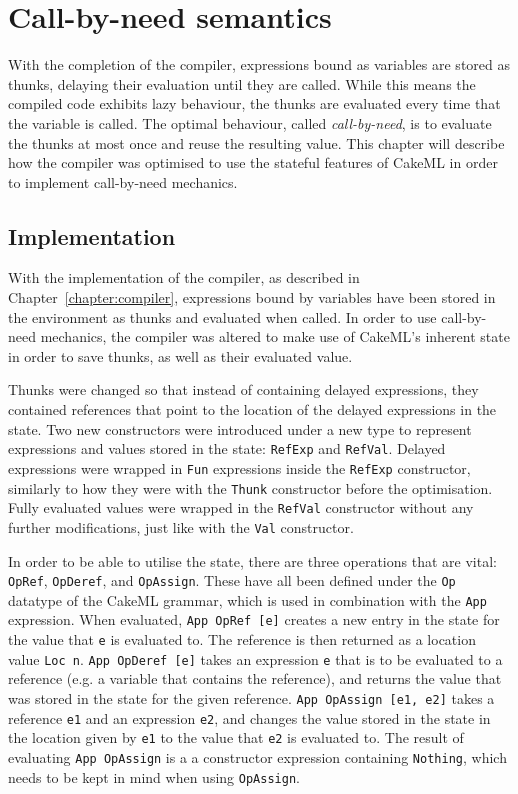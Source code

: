\chapter{Call-by-need semantics}
With the completion of the compiler, expressions bound as variables are stored
as thunks, delaying their evaluation until they are called. While this means
the compiled code exhibits lazy behaviour, the thunks are evaluated every
time that the variable is called. The optimal behaviour, called
\textit{call-by-need}, is to evaluate the thunks at most once and reuse the
resulting value. This chapter will describe how the compiler was optimised to
use the stateful features of CakeML in order to implement call-by-need
mechanics.

\section{Implementation}
\label{cbn:impl}
With the implementation of the compiler, as described in
Chapter~\ref{chapter:compiler}, expressions bound by variables have been stored
in the environment as thunks and evaluated when called. In order to use
call-by-need mechanics, the compiler was altered to make use of CakeML's
inherent state in order to save thunks, as well as their evaluated value.

Thunks were changed so that instead of containing delayed expressions, they
contained references that point to the location of the delayed expressions in
the state. Two new constructors were introduced under a new type to represent
expressions and values stored in the state: \texttt{RefExp} and \texttt{RefVal}.
Delayed expressions were wrapped in \texttt{Fun} expressions inside the
\texttt{RefExp} constructor, similarly to how they were with the \texttt{Thunk}
constructor before the optimisation. Fully evaluated values were wrapped in the
\texttt{RefVal} constructor without any further modifications, just like with
the \texttt{Val} constructor.

In order to be able to utilise the state, there are three operations that are
vital: \texttt{OpRef}, \texttt{OpDeref}, and \texttt{OpAssign}. These have all
been defined under the \texttt{Op} datatype of the CakeML grammar, which is used
in combination with
the \texttt{App} expression. When evaluated, \texttt{App OpRef [e]} creates a new
entry in the state for the value that \texttt{e} is evaluated to. The reference
is then returned as a location value \texttt{Loc n}. \texttt{App OpDeref [e]}
takes an expression \texttt{e} that is to be evaluated to a reference (e.g. a
variable that contains the reference), and returns the value that was stored in
the state for the given reference. \texttt{App OpAssign [e1, e2]} takes a
reference \texttt{e1} and an expression \texttt{e2}, and changes the value
stored in the state in the location given by \texttt{e1} to the value that
\texttt{e2} is evaluated to. The result of evaluating \texttt{App OpAssign}
is a a constructor expression containing \texttt{Nothing}, which needs to be
kept in mind when using \texttt{OpAssign}.

